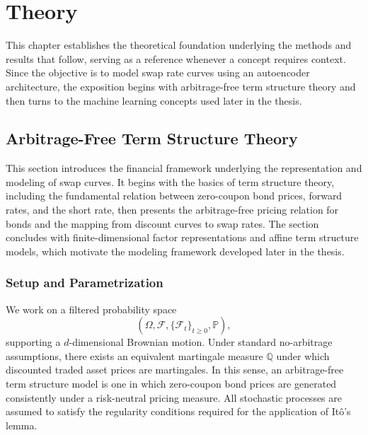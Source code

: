 \chapter{Theory}
\label{chap:theory}

This chapter establishes the theoretical foundation underlying the methods and results that follow, serving as a reference whenever a concept requires context. Since the objective is to model swap rate curves using an autoencoder architecture, the exposition begins with arbitrage-free term structure theory and then turns to the machine learning concepts used later in the thesis.

\section{Arbitrage-Free Term Structure Theory}
\label{sec:term_structure_theory}

This section introduces the financial framework underlying the representation and modeling of swap curves. It begins with the basics of term structure theory, including the fundamental relation between zero-coupon bond prices, forward rates, and the short rate, then presents the arbitrage-free pricing relation for bonds and the mapping from discount curves to swap rates. The section concludes with finite-dimensional factor representations and affine term structure models, which motivate the modeling framework developed later in the thesis.

\subsection{Setup and Parametrization}

We work on a filtered probability space
\[
(\Omega,\mathcal{F},\{\mathcal{F}_t\}_{t\ge 0},\mathbb{P}),
\]
supporting a $d$-dimensional Brownian motion. Under standard no-arbitrage assumptions, there exists an equivalent martingale measure $\mathbb{Q}$ under which discounted traded asset prices are martingales. In this sense, an arbitrage-free term structure model is one in which zero-coupon bond prices are generated consistently under a risk-neutral pricing measure. All stochastic processes are assumed to satisfy the regularity conditions required for the application of It\^o's lemma.

